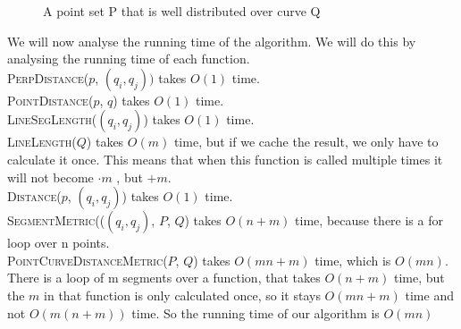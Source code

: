 \documentclass[a4paper,11pt]{article}
\begin{document}
\begin{figure}[H]
	\centering
	\def\svgwidth{0.5\textwidth}
	
	\caption{A point set P that is well distributed over curve Q}
	\label{fig:line-weight}
\end{figure}

 
	
	
We will now analyse the running time of the algorithm. 
We will do this by analysing the running time of each function.\\
\textsc{PerpDistance}($p$, $(q_i, q_j))$ takes $O(1)$ time.\\
\textsc{PointDistance}($p$, $q$) takes $O(1)$ time. \\
\textsc{LineSegLength}($(q_i, q_j)$) takes $O(1)$ time. \\
\textsc{LineLength}($Q$) takes $O(m)$ time, but if we cache the result, we only have to calculate it once. This means that when this function is called multiple times it will not become $\cdot m$ , but $+m$.\\
\textsc{Distance}($p$, $(q_i, q_j)$) takes $O(1)$ time.\\
\textsc{SegmentMetric}(($(q_i, q_j)$, $P$, $Q$) takes $O(n+m)$ time, because there is a for loop over n points. \\
\textsc{PointCurveDistanceMetric}($P$, $Q$)  takes $O(mn + m)$ time, which is $O(mn)$. 
There is a loop of m segments over a function, that takes $O(n+m)$ time, but the $m$ in that function is only calculated once, so it stays $O(mn+m)$ time and not $O(m(n+m))$ time.
So the running time of our algorithm is  $O(mn)$ \\
\end{document}
